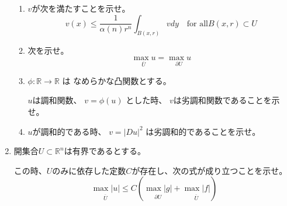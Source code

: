 \documentclass[12pt,b5paper]{ltjsarticle}
\begin{document}
\begin{enumerate}
      \begin{enumerate}
       \item

            $v$が次を満たすことを示せ。
            \begin{equation}
             v(x) \leq \frac{1}{\alpha(n)r^{n}}
              \int_{B(x,r)} v dy
              \quad \text{for all} B(x,r) \subset U
            \end{equation}

            \dotfill



            \hrulefill

       \item

            次を示せ。
            \begin{equation}
             \underset{\overline{U}}{\max {u}}
              = \underset{\partial{U}}{\max {u}}
            \end{equation}

            \dotfill



            \hrulefill

       \item

            $\phi : \mathbb{R}\to\mathbb{R}$
            は
            なめらかな凸関数とする。

            $u$は調和関数、
            $v = \phi(u)$
            とした時、
            $v$は劣調和関数であることを示せ。

            \dotfill



            \hrulefill

       \item

            $u$が調和的である時、
            $v = \lvert Du \rvert^{2}$
            は劣調和的であることを示せ。

            \dotfill



            \hrulefill

      \end{enumerate}



 \item


      開集合$U \subset \mathbb{R}^{n}$は有界であるとする。

      この時、$U$のみに依存した定数$C$が存在し、次の式が成り立つことを示せ。
      \begin{equation}
       \underset{\overline{U}}{\max {\lvert u \rvert}}
        \leq
        C \left(
        \underset{\partial{U}}{\max {\lvert g \rvert}}
        +
        \underset{\overline{U}}{\max {\lvert f \rvert}}
        \right)
      \end{equation}



\end{enumerate}
\end{document}
